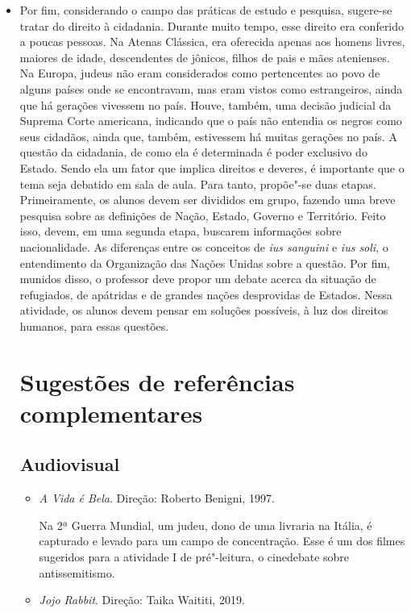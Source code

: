 \documentclass[12pt]{extarticle}
\begin{document}
\begin{itemize}
\item Por fim, considerando o campo das práticas de estudo e pesquisa,
sugere-se tratar do direito à cidadania.
Durante muito tempo, esse direito era conferido a poucas
pessoas. Na Atenas Clássica, era oferecida apenas aos homens livres,
maiores de idade, descendentes de jônicos, filhos de pais e mães
atenienses. Na Europa, judeus não eram considerados como pertencentes
ao povo de alguns países onde se encontravam, mas eram vistos como
estrangeiros, ainda que há gerações vivessem no país. Houve, também,
uma decisão judicial da Suprema Corte americana, indicando que o país
não entendia os negros como seus cidadãos, ainda que, também,
estivessem há muitas gerações no país. A questão da cidadania, de como
ela é determinada é poder exclusivo do Estado. Sendo ela um fator que
implica direitos e deveres, é importante que o tema seja debatido em
sala de aula. Para tanto, propõe"-se duas etapas. Primeiramente, os
alunos devem ser divididos em grupo, fazendo uma breve pesquisa sobre
as definições de Nação, Estado, Governo e Território. Feito isso,
devem, em uma segunda etapa, buscarem informações sobre nacionalidade.
As diferenças entre os conceitos de \emph{ius sanguini} e \emph{ius
soli}, o entendimento da Organização das Nações Unidas sobre a
questão. Por fim, munidos disso, o professor deve propor um debate
acerca da situação de refugiados, de apátridas e de grandes nações
desprovidas de Estados. Nessa atividade, os alunos devem pensar em
soluções possíveis, à luz dos direitos humanos, para essas questões.

\section{Sugestões de referências complementares}

\subsection{Audiovisual}

\begin{itemize}

\item\textit{A Vida é Bela}. Direção: Roberto Benigni, 1997.

Na 2ª Guerra Mundial, um judeu, dono de uma livraria na Itália,
é capturado e levado para um campo de concentração. Esse é um dos 
filmes sugeridos para a atividade I de pré"-leitura, 
o cinedebate sobre antissemitismo.

\item\textit{Jojo Rabbit}. Direção: Taika Waititi, 2019.


\end{itemize}
\end{itemize}
\end{document}
